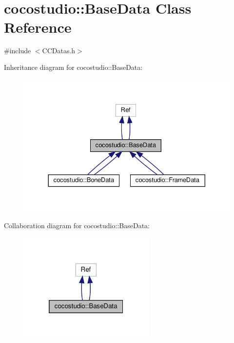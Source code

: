 \hypertarget{classcocostudio_1_1BaseData}{}\section{cocostudio\+:\+:Base\+Data Class Reference}
\label{classcocostudio_1_1BaseData}


{\ttfamily \#include $<$C\+C\+Datas.\+h$>$}



Inheritance diagram for cocostudio\+:\+:Base\+Data\+:
\nopagebreak
\begin{figure}[H]
\begin{center}
\leavevmode
\includegraphics[width=330pt]{classcocostudio_1_1BaseData__inherit__graph}
\end{center}
\end{figure}


Collaboration diagram for cocostudio\+:\+:Base\+Data\+:
\nopagebreak
\begin{figure}[H]
\begin{center}
\leavevmode
\includegraphics[width=193pt]{classcocostudio_1_1BaseData__coll__graph}
\end{center}
\end{figure}
